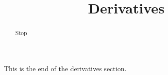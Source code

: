 \documentclass[handout]{ximera}
\title{Derivatives}
\begin{document}
\begin{abstract} Stop
\end{abstract}

\maketitle

This is the end of the derivatives section.
\end{document}
